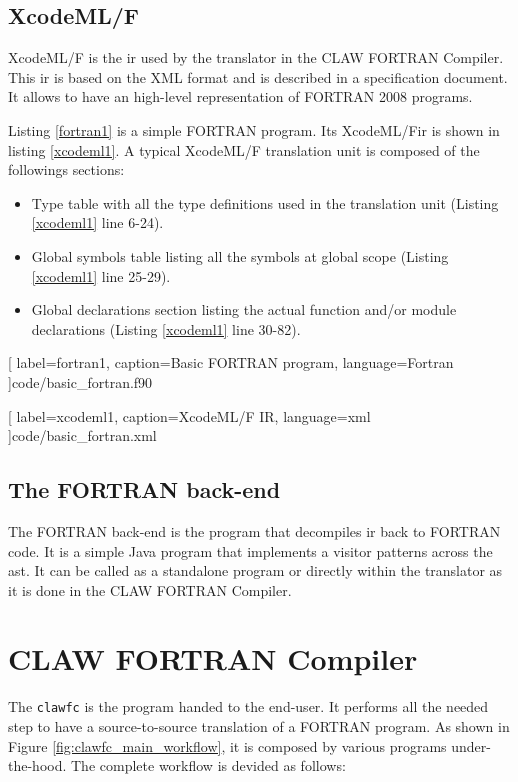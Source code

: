 \documentclass[a4paper, 11pt]{report}
\def\clawfcomp{CLAW FORTRAN Compiler\xspace}
\def\xcodeml{XcodeML/F\xspace}
\def\clawfc{\lstinline!clawfc!\xspace}
\begin{document}
\subsection{\xcodeml}
\xcodeml\cite{omni:xcodemlf95,omni:xcodemlf2008} is the \gls{ir} used by the 
translator in the CLAW FORTRAN Compiler. This \gls{ir} is based on the XML
format and is described in a specification document. It allows to have an
high-level representation of FORTRAN 2008 programs.

Listing \ref{fortran1} is a simple FORTRAN program. Its \xcodeml \gls{ir} is 
shown in listing \ref{xcodeml1}. A typical \xcodeml translation unit is
composed of the followings sections: 
\begin{itemize}
\item Type table with all the type definitions used in the translation unit
(Listing \ref{xcodeml1} line 6-24).
\item Global symbols table listing all the symbols at global scope (Listing
\ref{xcodeml1} line 25-29).
\item Global declarations section listing the actual function and/or module
declarations (Listing \ref{xcodeml1} line 30-82).
\end{itemize}


  [
    label=fortran1, 
    caption=Basic FORTRAN program, 
    language=Fortran
  ]{code/basic_fortran.f90}


  [
    label=xcodeml1, 
    caption=\xcodeml IR, 
    language=xml
  ]{code/basic_fortran.xml}

\subsection{The FORTRAN back-end}
The FORTRAN back-end is the program that decompiles \gls{ir} back to FORTRAN 
code. It is a simple Java program that implements a visitor patterns across 
the \gls{ast}. It can be called as a standalone program or directly within the
translator as it is done in the \clawfcomp.

\section{\clawfcomp}

The \clawfc is the program handed to the end-user. It performs all the needed 
step to have a source-to-source translation of a FORTRAN program. As shown in 
Figure \ref{fig:clawfc_main_workflow}, it is composed by various programs 
under-the-hood. The complete workflow is devided as follows: 
\end{document}
